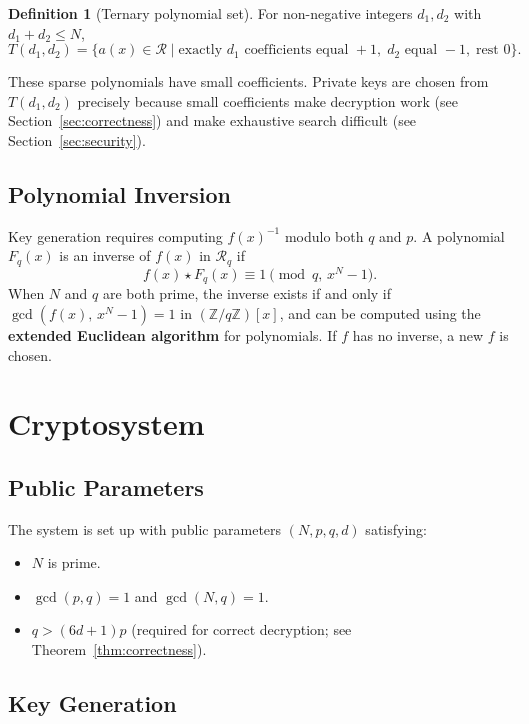\documentclass[12pt, a4paper]{article}
\theoremstyle{definition}
\newtheorem{definition}{Definition}[section]
\theoremstyle{plain}
\newcommand{\Z}{\mathbb{Z}}
\newcommand{\R}{\mathcal{R}}
\begin{document}
\begin{definition}[Ternary polynomial set]
    For non-negative integers $d_1, d_2$ with $d_1 + d_2 \le N$,
    \[
        T(d_1, d_2) = \bigl\{ a(x) \in \R \mid
            \text{exactly } d_1 \text{ coefficients equal } +1,\;
            d_2 \text{ equal } -1,\; \text{rest } 0 \bigr\}.
    \]
\end{definition}

These sparse polynomials have small coefficients. Private keys are chosen from $T(d_1, d_2)$ precisely because small coefficients make decryption work (see Section~\ref{sec:correctness}) and make exhaustive search difficult (see Section~\ref{sec:security}).

\subsection{Polynomial Inversion}

Key generation requires computing $f(x)^{-1}$ modulo both $q$ and $p$.
A polynomial $F_q(x)$ is an inverse of $f(x)$ in $\R_q$ if
\[
    f(x) \star F_q(x) \equiv 1 \pmod{q, \, x^N - 1}.
\]
When $N$ and $q$ are both prime, the inverse exists if and only if
$\gcd(f(x),\, x^N - 1) = 1$ in $(\Z/q\Z)[x]$, and can be computed using the
\textbf{extended Euclidean algorithm} for polynomials. If $f$ has no inverse,
a new $f$ is chosen.

\section{Cryptosystem}

\subsection{Public Parameters}

The system is set up with public parameters $(N, p, q, d)$ satisfying:
\begin{itemize}
    \item $N$ is prime.
    \item $\gcd(p, q) = 1$ and $\gcd(N, q) = 1$.
    \item $q > (6d+1)p$ \quad (required for correct decryption; see
          Theorem~\ref{thm:correctness}).
\end{itemize}

\subsection{Key Generation}
\end{document}
